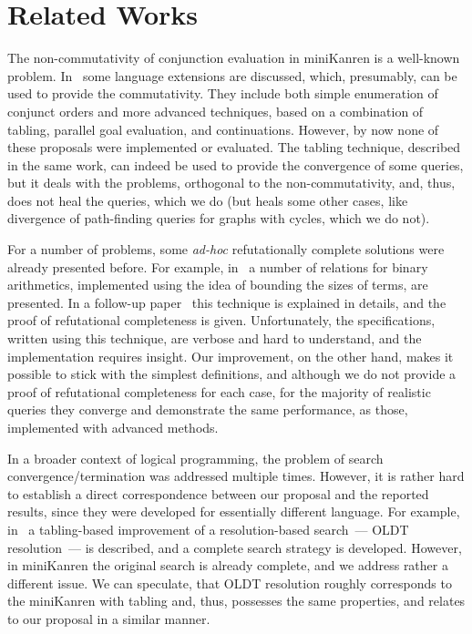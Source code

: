 \section{Related Works}
\label{sec:related_works}

The non-commutativity of conjunction evaluation in miniKanren is a well-known problem. In~\cite{WillThesis} some language
extensions are discussed, which, presumably, can be used to provide the commutativity. They include both simple enumeration
of conjunct orders and more advanced techniques, based on a combination of tabling, parallel goal evaluation, and continuations.
However, by now none of these proposals were implemented or evaluated. The tabling technique, described in the same work, can
indeed be used to provide the convergence of some queries, but it deals with the problems, orthogonal to the non-commutativity,
and, thus, does not heal the queries, which we do (but heals some other cases, like divergence of path-finding queries for
graphs with cycles, which we do not). 

For a number of problems, some \emph{ad-hoc} refutationally complete solutions were already presented before. For example,
in~\cite{TRS} a number of relations for binary arithmetics, implemented using the idea of bounding the sizes of terms, are
presented. In a follow-up paper~\cite{KiselyovArithmetic} this technique is explained in details, and the proof of refutational
completeness is given. Unfortunately, the specifications, written using this technique, are verbose and
hard to understand, and the implementation requires insight. Our improvement, on the other hand, makes it possible to stick
with the simplest definitions, and although we do not provide a proof of refutational completeness for each case, for the
majority of realistic queries they converge and demonstrate the same performance, as those, implemented with advanced methods.

In a broader context of logical programming, the problem of search convergence/termination was addressed multiple
times. However, it is rather hard to establish a direct correspondence between our proposal and the reported results,
since they were developed for essentially different language. For example, in~\cite{OLDresolution} a tabling-based
improvement of a resolution-based search~--- OLDT resolution~--- is described, and a complete search strategy is developed.
However, in miniKanren the original search is already complete, and we address rather a different issue. We can speculate,
that OLDT resolution roughly corresponds to the miniKanren with tabling and, thus, possesses the same properties, and relates to
our proposal in a similar manner.

